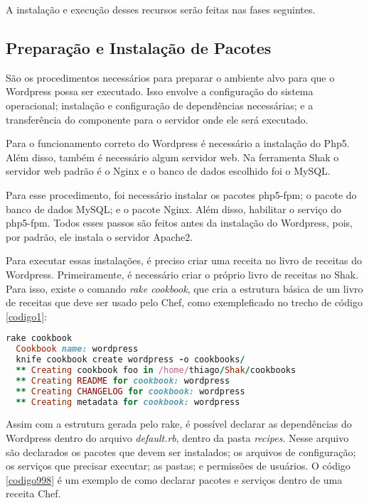 A instalação e execução desses recursos serão feitas nas fases seguintes.

\subsection{Preparação e Instalação de Pacotes}
\label{wordpress:preparacao}

São os procedimentos necessários para preparar o ambiente alvo para que o Wordpress
possa ser executado. Isso envolve a configuração do sistema operacional; instalação
e configuração de dependências necessárias; e a transferência do componente
para o servidor onde ele será executado.

Para o funcionamento correto do Wordpress é necessário a instalação do Php5. Além
disso, também é necessário algum servidor web. Na ferramenta Shak o servidor
web padrão é o Nginx e o banco de dados escolhido foi o MySQL.

Para esse procedimento, foi necessário instalar os pacotes php5-fpm; o pacote
do banco de dados MySQL; e o pacote Nginx. Além disso, habilitar o serviço do
php5-fpm. Todos esses passos são feitos antes da instalação do Wordpress,
pois, por padrão, ele instala o servidor
Apache2.

Para executar essas instalações, é preciso criar uma receita no livro de receitas
do Wordpress. Primeiramente, é necessário criar o próprio livro de receitas no Shak.
Para isso, existe o comando \textit{rake cookbook}, que cria a estrutura básica
de um livro de receitas que deve ser usado pelo Chef, como exempleficado no trecho
de código \ref{codigo1}:

\begin{lstlisting}[language=Ruby,label=dice_index,caption={Exemplo de criação de estrutura básica de livro de receitas do wordpress com shak}, label=codigo1]
  rake cookbook
  Cookbook name: wordpress
  knife cookbook create wordpress -o cookbooks/
  ** Creating cookbook foo in /home/thiago/Shak/cookbooks
  ** Creating README for cookbook: wordpress
  ** Creating CHANGELOG for cookbook: wordpress
  ** Creating metadata for cookbook: wordpress
\end{lstlisting}

Assim com a estrutura gerada pelo rake, é possível declarar as dependências do Wordpress
dentro do arquivo \textit{default.rb}, dentro da pasta \textit{recipes}. Nesse 
arquivo são declarados os pacotes que devem ser instalados; os arquivos de configuração;
os serviços que precisar executar; as pastas; e permissões de usuários. O código \ref{codigo998}
é um exemplo de como declarar pacotes e serviços dentro de uma receita Chef.


